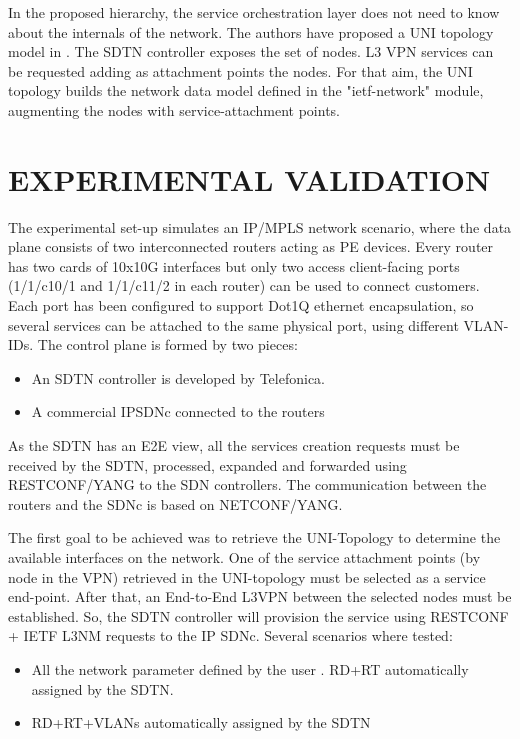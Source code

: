 \documentclass[conference]{IEEEtran}
\begin{document}
In the proposed hierarchy, the service orchestration layer does not need to know about the internals of the network. The authors have proposed a UNI topology model in \cite{b4}. The SDTN controller exposes the set of nodes. L3 VPN services can be requested adding as attachment points the nodes. For that aim, the UNI topology builds the network data model defined in the "ietf-network" module, augmenting the nodes with service-attachment points.

\section{EXPERIMENTAL VALIDATION}

The experimental set-up simulates an IP/MPLS network scenario, where the data plane consists of two interconnected routers acting as PE devices. Every router has two cards of 10x10G interfaces but only two access client-facing ports (1/1/c10/1 and 1/1/c11/2 in each router) can be used to connect customers. Each port has been configured to support Dot1Q ethernet encapsulation, so several services can be attached to the same physical port, using different VLAN-IDs. The control plane is formed by two pieces:
\begin{itemize}
    \item An SDTN controller is developed by Telefonica. 
    \item A commercial IPSDNc connected to the routers
\end{itemize}
As the SDTN has an E2E view, all the services creation requests must be received by the SDTN, processed, expanded and forwarded using RESTCONF/YANG to the SDN controllers. The communication between the routers and the SDNc is based on NETCONF/YANG. 

The first goal to be achieved was to retrieve the UNI-Topology to determine the available interfaces on the network. One of the service attachment points (by node in the VPN) retrieved  in the UNI-topology must be selected as a service end-point. After that, an End-to-End L3VPN between the selected nodes must be established. So, the SDTN controller will provision the service using RESTCONF + IETF L3NM requests to the IP SDNc. Several scenarios where tested:
\begin{itemize}
    \item All the network parameter defined by the user . 
    \itme RD+RT automatically assigned by the SDTN. 
    \item RD+RT+VLANs automatically assigned by the SDTN
\end{itemize}
\end{document}
